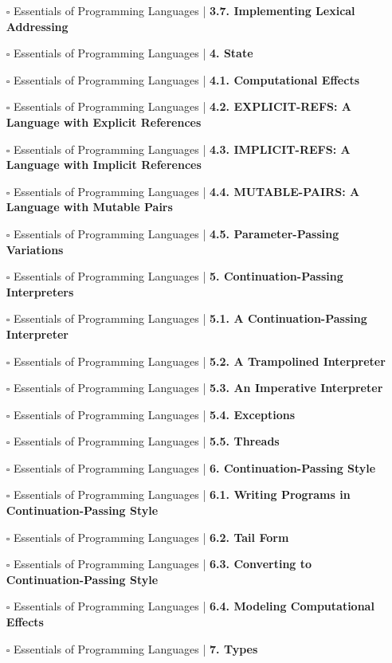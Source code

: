 \documentclass[a4, landscape, 12pt]{article}
\newcommand{\checkbox}{$\square$}%
\begin{document}
\begin{itemize}
{}
\item [\checkbox]  Essentials of Programming Languages | \textbf{ 3.7. Implementing Lexical Addressing
}
\item [\checkbox]  Essentials of Programming Languages | \textbf{ 4. State
}
\item [\checkbox]  Essentials of Programming Languages | \textbf{ 4.1. Computational Effects
}
\item [\checkbox]  Essentials of Programming Languages | \textbf{ 4.2. EXPLICIT-REFS: A Language with Explicit References
}
\item [\checkbox]  Essentials of Programming Languages | \textbf{ 4.3. IMPLICIT-REFS: A Language with Implicit References
}
\item [\checkbox]  Essentials of Programming Languages | \textbf{ 4.4. MUTABLE-PAIRS: A Language with Mutable Pairs
}
\item [\checkbox]  Essentials of Programming Languages | \textbf{ 4.5. Parameter-Passing Variations
}
\item [\checkbox]  Essentials of Programming Languages | \textbf{ 5. Continuation-Passing Interpreters
}
\item [\checkbox]  Essentials of Programming Languages | \textbf{ 5.1. A Continuation-Passing Interpreter
}
\item [\checkbox]  Essentials of Programming Languages | \textbf{ 5.2. A Trampolined Interpreter
}
\item [\checkbox]  Essentials of Programming Languages | \textbf{ 5.3. An Imperative Interpreter
}
\item [\checkbox]  Essentials of Programming Languages | \textbf{ 5.4. Exceptions
}
\item [\checkbox]  Essentials of Programming Languages | \textbf{ 5.5. Threads
}
\item [\checkbox]  Essentials of Programming Languages | \textbf{ 6. Continuation-Passing Style
}
\item [\checkbox]  Essentials of Programming Languages | \textbf{ 6.1. Writing Programs in Continuation-Passing Style
}
\item [\checkbox]  Essentials of Programming Languages | \textbf{ 6.2. Tail Form
}
\item [\checkbox]  Essentials of Programming Languages | \textbf{ 6.3. Converting to Continuation-Passing Style
}
\item [\checkbox]  Essentials of Programming Languages | \textbf{ 6.4. Modeling Computational Effects
}
\item [\checkbox]  Essentials of Programming Languages | \textbf{ 7. Types
}
\end{itemize}
\end{document}
